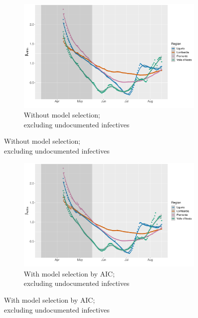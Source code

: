 \documentclass[12pt]{article}
\begin{document}
\begin{appendices}
		\begin{figure}[H]
    	    \centering
    	    \begin{subfigure}{\textwidth}
    	      \centering
    	      \includegraphics[width=0.91\linewidth]{output/model_within_lag14_betawithin_Nord-Ovest_rollingwindow30.pdf}
    	      \caption{Without model selection; \\ excluding undocumented infectives}
    	      \label{fig:beta_within_over_time_northwest_lowsample_regular}
    	    \end{subfigure}\newline
        \end{figure}
        \begin{figure}[H]\ContinuedFloat
    	    \begin{subfigure}{\textwidth}
    	      \centering
    	      \includegraphics[width=0.91\linewidth]{output/model_within_lag14_betawithin_Nord-Ovest_aic_rollingwindow30.pdf}
    	      \caption{With model selection by AIC; \\ excluding undocumented infectives}
    	      \label{fig:beta_within_over_time_northwest_lowsample_aic}
    	    \end{subfigure}

\end{figure}
\end{appendices}
\end{document}

